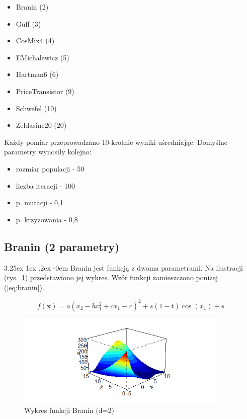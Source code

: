 \documentclass[11pt, a4paper]{article}
\makeatletter
\newcommand{\fbi}{\leavevmode{\parindent=1em\indent}}
\renewcommand\paragraph{\@startsection{paragraph}{5}{\z@}%
  {3.25ex \@plus1ex \@minus.2ex}%
  {-0em}%
  {\normalfont\normalsize\bfseries}}
\makeatother
\begin{document}
\begin{itemize}
	\item Branin (2)
	\item Gulf (3)
	\item CosMix4 (4)
	\item EMichalewicz (5)
	\item Hartman6 (6)
	\item PriceTransistor (9)
	\item Schwefel (10)
	\item Zeldasine20 (20)
\end{itemize}

\fbi
Każdy pomiar przeprowadzano 10-krotnie wyniki uśredniając. Domyślne parametry wynosiły kolejno:

\begin{itemize}
	\item rozmiar populacji - 50
	\item liczba iteracji - 100
	\item p. mutacji - 0,1
	\item p. krzyżowania - 0,8
\end{itemize}

\subsection{Branin (2 parametry)}
\paragraph{}
Branin jest funkcją z dwoma parametrami. Na ilustracji (rys.~\ref{fig:branin1}) przedstawiono jej wykres. Wzór funkcji zamieszczono poniżej (\ref{eq:branin}).

\begin{equation}\label{eq:branin}
	f(\boldsymbol{x}) = a(x_2 - bx_1^2 + cx_1 - r)^2 + s(1 - t)\cos(x_1) + s
\end{equation}


\begin{figure}[H]
	\centering
	\includegraphics[width=0.9\textwidth]{./assets/branin1.png}
	\caption{Wykres funkcji Branin (d=2)}
	\label{fig:branin1}
\end{figure}
\end{document}
